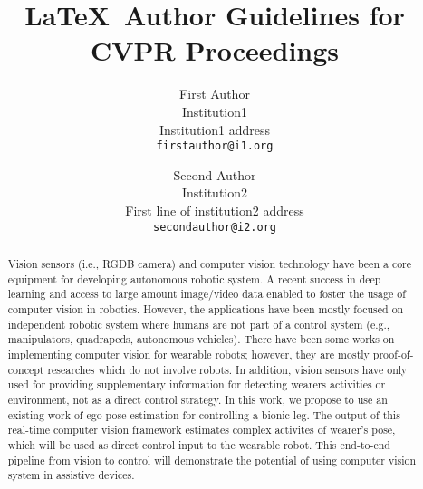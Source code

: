 \documentclass[10pt,twocolumn,letterpaper]{article}
\begin{document}
\title{\LaTeX\ Author Guidelines for CVPR Proceedings}

\author{First Author\\
Institution1\\
Institution1 address\\
{\tt\small firstauthor@i1.org}
\and
Second Author\\
Institution2\\
First line of institution2 address\\
{\tt\small secondauthor@i2.org}
}

\maketitle

\begin{abstract}
   Vision sensors (i.e., RGDB camera) and computer vision technology have been a core equipment for developing autonomous robotic system. A recent success in deep learning and access to large amount image/video data enabled to foster the usage of computer vision in robotics. However, the applications have been mostly focused on independent robotic system where humans are not part of a control system (e.g., manipulators, quadrapeds, autonomous vehicles). There have been some works on implementing computer vision for wearable robots; however, they are mostly proof-of-concept researches which do not involve robots. In addition, vision sensors have only used for providing supplementary information for detecting wearers activities or environment, not as a direct control strategy. In this work, we propose to use an existing work of ego-pose estimation for controlling a bionic leg. The output of this real-time computer vision framework estimates complex activites of wearer's pose, which will be used as direct control input to the wearable robot. This end-to-end pipeline from vision to control will demonstrate the potential of using computer vision system in assistive devices.  
\end{abstract}

\end{document}
